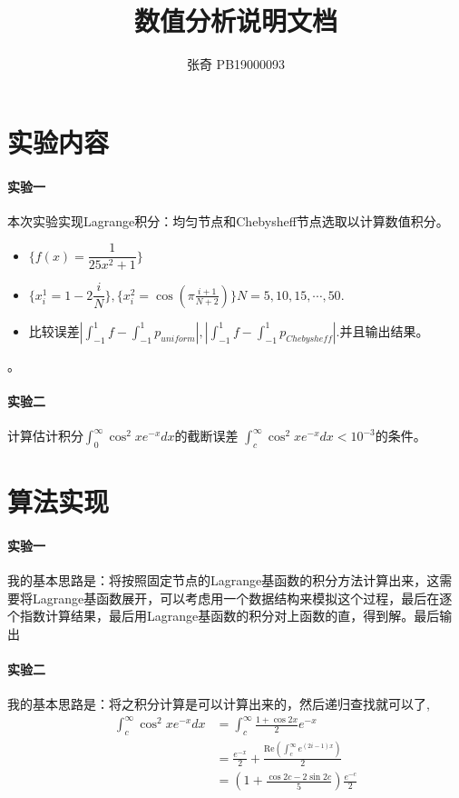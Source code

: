 \documentclass{article}
\title{数值分析说明文档}
\author{张奇 PB19000093}
\begin{document}
\begin{CJK}{UTF8}{gbsn}
    	\maketitle
    \section{实验内容}
    	\paragraph{实验一}本次实验实现Lagrange积分：均匀节点和Chebysheff节点选取以计算数值积分。
    	\begin{itemize}
    		\item $\{f(x) = \dfrac{1}{25x^2+1}\}$
    		\item $\{x_i^1 = 1 - 2\dfrac{i}{N}\},\{x_i^2 = \cos(\pi\frac{i+1}{N+2})\}  N = 5,10,15,\cdots, 50. $
    		\item 比较误差$|\int_{-1}^1 f - \int_{-1}^1 p_{uniform}|,  |\int_{-1}^1 f - \int_{-1}^1 p_{Chebysheff}|.$并且输出结果。
    	\end{itemize}。
    	\paragraph{实验二}计算估计积分$\int_0^\infty \cos^2 x e^{-x} dx$的截断误差 $\int_c^\infty \cos^2 x e^{-x} dx < 10^{-3}$的条件。
    \section{算法实现}
		\paragraph{实验一}
			我的基本思路是：将按照固定节点的Lagrange基函数的积分方法计算出来，这需要将Lagrange基函数展开，可以考虑用一个数据结构来模拟这个过程，最后在逐个指数计算结果，最后用Lagrange基函数的积分对上函数的直，得到解。最后输出
		\paragraph{实验二}
			我的基本思路是：将之积分计算是可以计算出来的，然后递归查找就可以了,
			\begin{align}
				\int_c^\infty \cos^2 x e^{-x} dx & = \int_c^\infty \frac{1 +  \cos 2x}{2} e^{-x} \\
				 & = \frac{e^{-x}}{2} + \frac{\mbox{Re}(\int_c^\infty e^{(2i-1)x} )}{2} \\
				 & = (1+\frac{\cos 2c - 2 \sin 2c}{5}) \frac{e^{-c}}{2}
			\end{align}

\end{CJK}
\end{document}
